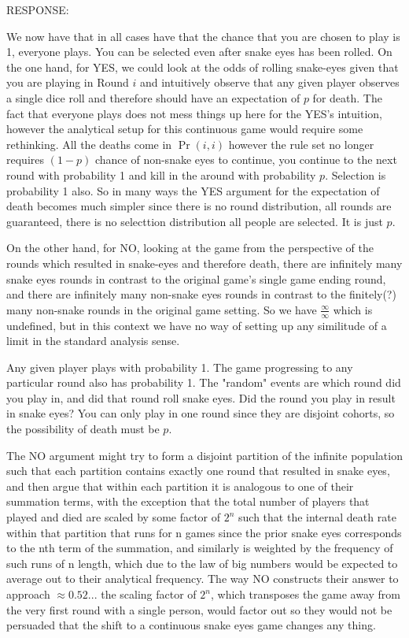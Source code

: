 \documentclass[article,twocolumn]{memoir}
\begin{document}
\begin{itemize}
    {\color{violet}
        RESPONSE: 
        
        We now have that in all cases have that the chance that you are chosen to play is 1, everyone plays.  You can be selected even after snake eyes has been rolled.  On the one hand, for YES, we could look at the odds of rolling snake-eyes given that you are playing in Round $i$ and intuitively observe that any given player observes a single dice roll and therefore should have an expectation of $p$ for death.  The fact that everyone plays does not mess things up here for the YES's intuition, however the analytical setup for this continuous game would require some rethinking.  All the deaths come in $\Pr(i,i)$ however the rule set no longer requires $(1-p)$ chance of non-snake eyes to continue, you continue to the next round with probability 1 and kill in the around with probability $p$.  Selection is probability 1 also.  So in many ways the YES argument for the expectation of death becomes much simpler since there is no round distribution, all rounds are guaranteed, there is no selecttion distribution all people are selected.  It is just $p$.

        On the other hand, for NO, looking at the game from the perspective of the rounds which resulted in snake-eyes and therefore death, there are infinitely many snake eyes rounds in contrast to the original game's single game ending round, and there are infinitely many non-snake eyes rounds in contrast to the finitely(?) many non-snake rounds in the original game setting.  So we have $\frac{\infty}{\infty}$ which is undefined, but in this context we have no way of setting up any similitude of a limit in the standard analysis sense.

        Any given player plays with probability 1.  The game progressing to any particular round also has probability 1.  The "random" events are which round did you play in, and did that round roll snake eyes.  Did the round you play in result in snake eyes?  You can only play in one round since they are disjoint cohorts, so the possibility of death must be $p$.

        The NO argument might try to form a disjoint partition of the infinite population such that each partition contains exactly one round that resulted in snake eyes, and then argue that within each partition it is analogous to one of their summation terms, with the exception that the total number of players that played and died are scaled by some factor of $2^n$ such that the internal death rate within that partition that runs for n games since the prior snake eyes corresponds to the nth term of the summation, and similarly is weighted by the frequency of such runs of n length, which due to the law of big numbers would be expected to average out to their analytical frequency.  The way NO constructs their answer to approach $\approx 0.52...$ the scaling factor of $2^n$, which transposes the game away from the very first round with a single person, would factor out so they would not be persuaded that the shift to a continuous snake eyes game changes any thing. 
    }
\end{itemize}
\end{document}
